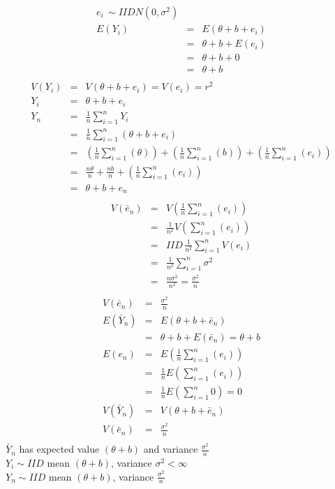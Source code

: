 \documentclass[12pt]{article}
\begin{document}
\begin{eqnarray} 
e_i \, \sim  IID N(0, \sigma^2)\nonumber \\
E(Y_i) & = & E(\theta + b + e_i)  \nonumber \\
& = & \theta + b + E(e_i)    \nonumber \\
& = & \theta + b + 0   \nonumber \\
& = & \theta + b  \nonumber \\ \nonumber
\end{eqnarray}
\begin{eqnarray}
V(Y_i) & = & V(\theta + b + e_i) = V(e_i) = r^2 \nonumber \\
Y_i & = & \theta + b + e_i  \nonumber \\
Y_n & = & \frac{1}{n} \sum_{i=1}^{n} Y_i \nonumber \\
& = & \frac{1}{n} \sum_{i=1}^{n} (\theta + b + e_i) \nonumber  \\
& = & (\frac{1}{n} \sum_{i=1}^{n} (\theta)) + (\frac{1}{n} \sum_{i=1}^{n} (b)) + (\frac{1}{n} \sum_{i=1}^{n} (e_i))  \nonumber  \\
& = & \frac{n \theta}{n} + \frac{nb}{n} + (\frac{1}{n} \sum_{i=1}^{n} (e_i)) \nonumber  \\
& = & \theta + b + e_n  \nonumber  \\  \nonumber 
\end{eqnarray}
\begin{eqnarray}
V(\bar e_n) & = & V( \frac{1}{n} \sum_{i=1}^{n} (e_i)) \nonumber  \\
& = & \frac{1}{n^2} V(\sum_{i=1}^{n} (e_i)) \nonumber  \\
& = & IID \, \frac{1}{n^2} \sum_{i=1}^{n} V(e_i) \nonumber  \\
& = & \frac{1}{n^2} \sum_{i=1}^{n} \sigma^2  \nonumber \\
& = & \frac{n \sigma^2}{n^2} = \frac{\sigma^2}{n} \nonumber  \\  \nonumber 
\end{eqnarray}
\begin{eqnarray} 
V(\bar e_n) & = & \frac{\sigma^2}{n} \nonumber \\
E(\bar Y_n) & = & E(\theta + b + \bar e_n)  \nonumber \\
& = & \theta + b + E(\bar e_n) = \theta + b \nonumber  \\
E(e_n) & = & E(\frac{1}{n} \sum_{i=1}^{n} (e_i)) \nonumber  \\
& = & \frac{1}{n} E(\sum_{i=1}^{n} (e_i))  \nonumber \\
& = & \frac{1}{n} E(\sum_{i=1}^{n} 0) = 0  \nonumber \\
V(\bar Y_n) & = & V(\theta + b + \bar e_n)  \nonumber \\
V(\bar e_n) & = & \frac{\sigma^2}{n}  \nonumber \\ \nonumber 
\end{eqnarray}
$\bar Y_n$ has expected value $(\theta + b)$ and variance $\frac{\sigma^2}{n}$\\
$Y_i \sim IID$ mean $(\theta + b)$, variance $\sigma^2 < \infty$ \\
$Y_n \sim IID$ mean $(\theta + b)$, variance $\frac{\sigma^2}{n}$ \\
\end{document}
